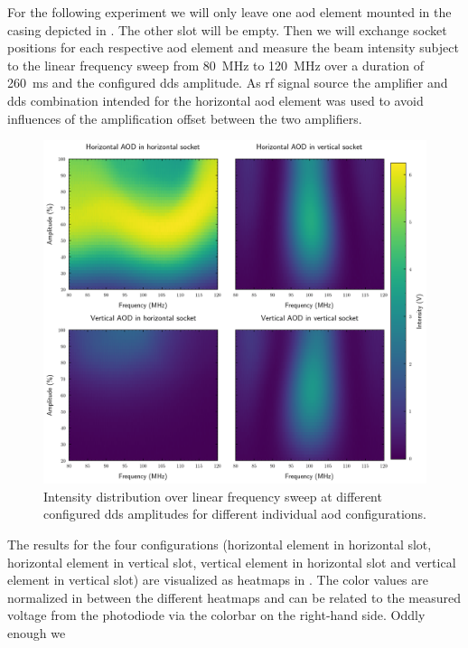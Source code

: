 For the following experiment we will only leave one \gls{aod} element mounted
in the casing depicted in . The other slot will be empty.
Then we will exchange socket positions for each respective \gls{aod} element
and measure the beam intensity subject to the linear frequency sweep from
\SI{80}{\mega\hertz} to \SI{120}{\mega\hertz} over a duration of
\SI{260}{\milli\second} and the configured \gls{dds} amplitude. As \gls{rf}
signal source the amplifier and \gls{dds} combination intended for the
horizontal \gls{aod} element was used to avoid influences of the amplification
offset between the two amplifiers.
\begin{figure}[htb]
  \centering
  \includegraphics[width=\textwidth]
  {../figure/intensity/distribution/unpaired-amplitude.png}
  \caption{Intensity distribution over linear frequency sweep at different
    configured \gls{dds} amplitudes for different individual \gls{aod}
    configurations.
  }\label{fig:intensity_distribution_unpaired}
\end{figure}
The results for the four configurations (horizontal element in horizontal
slot, horizontal element in vertical slot, vertical element in horizontal
slot and vertical element in vertical slot) are visualized as heatmaps in
. The color values are normalized in
between the different heatmaps and can be related to the measured voltage from
the photodiode via the colorbar on the right-hand side. Oddly enough we
